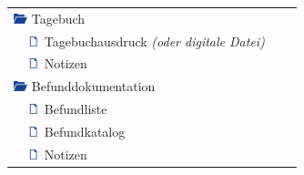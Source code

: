 \begin{center}
\begin{longtable}{l l l l}
		\multicolumn{2}{l}{\includegraphics[width=0.4cm]{bilder/OrdnerIconAuf.png} \hspace*{0.04cm} Tagebuch}\\
	    & \includegraphics[width=0.4cm]{bilder/DateiIcon.png} \hspace*{0.04cm} Tagebuchausdruck \textit{(oder digitale Datei)}\\
		& \includegraphics[width=0.4cm]{bilder/DateiIcon.png} \hspace*{0.04cm} Notizen\\
		
		\multicolumn{2}{l}{\includegraphics[width=0.4cm]{bilder/OrdnerIconAuf.png} \hspace*{0.04cm} Befunddokumentation}\\
	    & \includegraphics[width=0.4cm]{bilder/DateiIcon.png} \hspace*{0.04cm} Befundliste\\
		& \includegraphics[width=0.4cm]{bilder/DateiIcon.png} \hspace*{0.04cm} Befundkatalog\\
		& \includegraphics[width=0.4cm]{bilder/DateiIcon.png} \hspace*{0.04cm} Notizen\\
		

\end{longtable}
\end{center}
